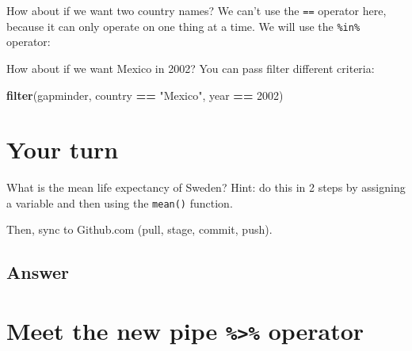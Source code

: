 \documentclass[]{book}
\newenvironment{Shaded}{\begin{snugshade}}{\end{snugshade}}
\newcommand{\KeywordTok}[1]{\textcolor[rgb]{0.13,0.29,0.53}{\textbf{#1}}}
\newcommand{\DecValTok}[1]{\textcolor[rgb]{0.00,0.00,0.81}{#1}}
\newcommand{\StringTok}[1]{\textcolor[rgb]{0.31,0.60,0.02}{#1}}
\newcommand{\OperatorTok}[1]{\textcolor[rgb]{0.81,0.36,0.00}{\textbf{#1}}}
\newcommand{\NormalTok}[1]{#1}
\theoremstyle{definition}
\theoremstyle{definition}
\theoremstyle{definition}
\theoremstyle{remark}
\begin{document}
How about if we want two country names? We can't use the \texttt{==}
operator here, because it can only operate on one thing at a time. We
will use the \texttt{\%in\%} operator:

\begin{Shaded}
\end{Shaded}

How about if we want Mexico in 2002? You can pass filter different
criteria:

\begin{Shaded}
\begin{Highlighting}[]
\KeywordTok{filter}\NormalTok{(gapminder, country }\OperatorTok{==}\StringTok{ "Mexico"}\NormalTok{, year }\OperatorTok{==}\StringTok{ }\DecValTok{2002}\NormalTok{)}
\end{Highlighting}
\end{Shaded}

\section{Your turn}\label{your-turn-7}

What is the mean life expectancy of Sweden? Hint: do this in 2 steps by
assigning a variable and then using the \texttt{mean()} function.

Then, sync to Github.com (pull, stage, commit, push).

\subsection{Answer}\label{answer}

\begin{Shaded}
\end{Shaded}

\section{\texorpdfstring{Meet the new pipe \texttt{\%\textgreater{}\%}
operator}{Meet the new pipe \%\textgreater{}\% operator}}\label{meet-the-new-pipe-operator}
\end{document}

